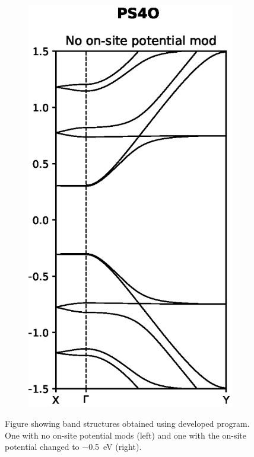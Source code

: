 \begin{figure}[h]
\begin{subfigure}[b]{0.45\textwidth}
    \label{PS4Odevnomod}
    \end{subfigure}
    ~
    \begin{subfigure}[b]{0.45\textwidth}
    \centering
    \includegraphics[width=\textwidth]{Figures/PS4Onomod.eps}
    \label{PS4Odevmod}
    \end{subfigure}
    \caption{Figure showing band structures obtained using developed program. One with no on-site potential mods (left) and one with the on-site potential changed to \SI{-0.5}{\electronvolt} (right).} 
    \label{PS4Odev}
\end{figure}
